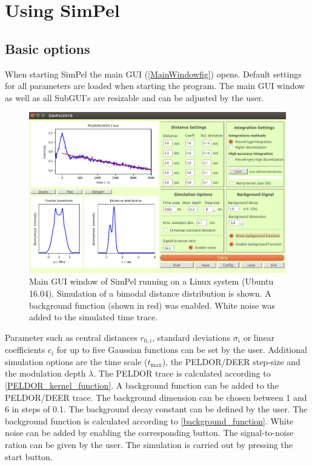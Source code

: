 \documentclass[pdftex,bezier,german,a4,twoside, headexclude,12pt,nochapterprefix, titlepage]{extarticle}
\newcommand{\simpel}{\textsf{SimPel} }
\begin{document}
\newpage
\section{Using \simpel}
\FloatBarrier
\subsection{Basic options}
When starting \simpel the main GUI (\autoref{MainWindowfig}) opens. Default settings for all parameters are loaded when starting
the program. The main GUI window as well as all SubGUI's are resizable and can be adjusted by the user.
\begin{figure}[h!]
\begin{center}
\includegraphics[scale=0.5]{Main_Window_example.png}
\caption{Main GUI window of \simpel running on a Linux system (Ubuntu 16.04). Simulation of a bimodal distance distribution is shown. A background
function (shown in red) was enabled. White noise was added to the simulated time trace.}
\label{MainWindowfig}
\end{center}
\end{figure}
Parameter such as central distances $r_{0,i}$, standard deviations $\sigma_i$ or linear coefficients $c_i$ for up to five
Gaussian functions can be set by the user. Additional simulation options are the time scale ($t_{\mathrm{max}}$), the 
PELDOR/DEER step-size and the modulation depth $\lambda$. The PELDOR trace is calculated according to  \autoref{PELDOR_kernel_function}.
A background function can be added to the PELDOR/DEER trace. The background dimension 
can be chosen between 1 and 6 in steps of 0.1. The background decay constant can be defined by the user. The background function is calculated according to \autoref{background_function}. White noise can be added by enabling the corresponding button. The signal-to-noise
ration can be given by the user.
The simulation is carried out by pressing the start button. 
\end{document}
